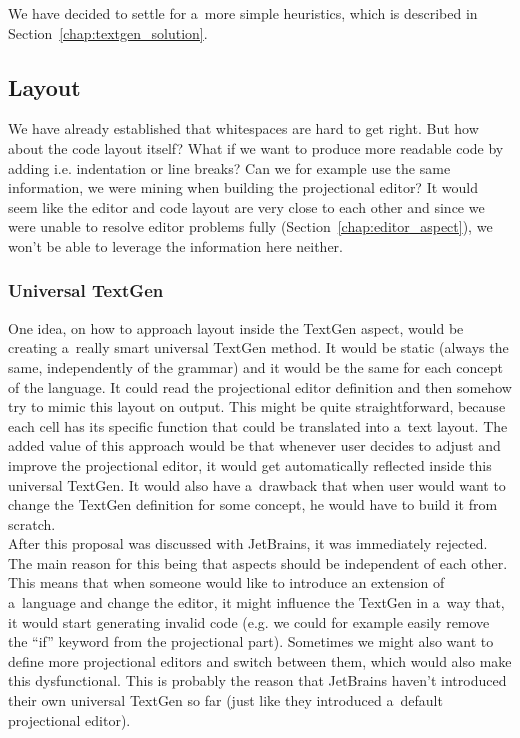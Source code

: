 We have decided to settle for a~more simple heuristics, which is described in Section~\ref{chap:textgen_solution}.

\subsection{Layout}

We have already established that whitespaces are hard to get right.
But how about the code layout itself?
What if we want to produce more readable code by adding i.e. indentation or line breaks?
Can we for example use the same information, we were mining when building the projectional editor?
It would seem like the editor and code layout are very close to each other and since we were unable to resolve editor problems fully (Section~\ref{chap:editor_aspect}), we won't be able to leverage the information here neither.

\subsubsection{Universal TextGen}
One idea, on how to approach layout inside the TextGen aspect, would be creating a~really smart universal TextGen method.
It would be static (always the same, independently of the grammar) and it would be the same for each concept of the language.
It could read the projectional editor definition and then somehow try to mimic this layout on output.
This might be quite straightforward, because each cell has its specific function that could be translated into a~text layout.
The added value of this approach would be that whenever user decides to adjust and improve the projectional editor, it would get automatically reflected inside this universal TextGen.
It would also have a~drawback that when user would want to change the TextGen definition for some concept, he would have to build it from scratch.
\\

After this proposal was discussed with JetBrains, it was immediately rejected.
The main reason for this being that aspects should be independent of each other.
This means that when someone would like to introduce an extension of a~language and change the editor, it might influence the TextGen in a~way that, it would start generating invalid code (e.g. we could for example easily remove the “if” keyword from the projectional part).
Sometimes we might also want to define more projectional editors and switch between them, which would also make this dysfunctional.
This is probably the reason that JetBrains haven't introduced their own universal TextGen so far (just like they introduced a~default projectional editor).

